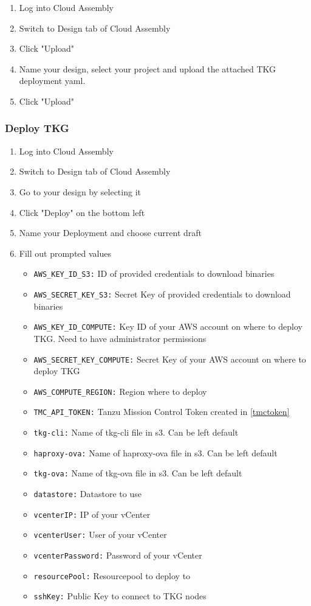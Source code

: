 \documentclass{article}
\begin{document}
\begin{enumerate}
  \item Log into Cloud Assembly
  \item Switch to Design tab of Cloud Assembly
  \item Click "Upload" 
  \item Name your design, select your project and upload the attached TKG deployment yaml.
  \item Click "Upload" 
\end{enumerate}


\subsubsection{Deploy TKG}

\begin{enumerate}
  \item Log into Cloud Assembly
  \item Switch to Design tab of Cloud Assembly
  \item Go to your design by selecting it
  \item Click "Deploy" on the bottom left
  \item Name your Deployment and choose current draft
  \item Fill out prompted values
  \begin{itemize}
  \item \verb|AWS_KEY_ID_S3:| ID of provided credentials to download binaries
  \item \verb|AWS_SECRET_KEY_S3:| Secret Key of provided credentials to download binaries
  \item \verb|AWS_KEY_ID_COMPUTE:| Key ID of your AWS account on where to deploy TKG. Need to have administrator permissions
  \item \verb|AWS_SECRET_KEY_COMPUTE:| Secret Key of your AWS account on where to deploy TKG
  \item \verb|AWS_COMPUTE_REGION:| Region where to deploy
  \item \verb|TMC_API_TOKEN:| Tanzu Mission Control Token created in \ref{tmctoken}
  \item \verb|tkg-cli:| Name of tkg-cli file in s3. Can be left default
  \item \verb|haproxy-ova:| Name of haproxy-ova file in s3. Can be left default
  \item \verb|tkg-ova:| Name of tkg-ova file in s3. Can be left default
  \item \verb|datastore:| Datastore to use
  \item \verb|vcenterIP:| IP of your vCenter
  \item \verb|vcenterUser:| User of your vCenter
  \item \verb|vcenterPassword:| Password of your vCenter
  \item \verb|resourcePool:| Resourcepool to deploy to
  \item \verb|sshKey:| Public Key to connect to TKG nodes

\end{itemize}
\end{enumerate}
\end{document}
